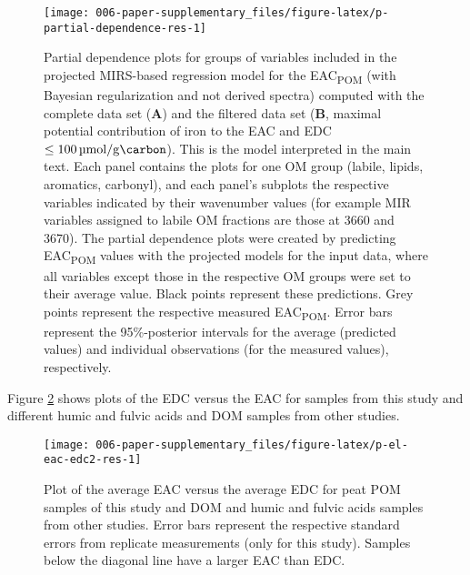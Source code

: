 \documentclass[draft,linenumbers]{agujournal2018}
\begin{document}
\begin{figure}[H]

{\centering \texttt{[image: 006-paper-supplementary\_files/figure-latex/p-partial-dependence-res-1]} 

}

\caption{Partial dependence plots for groups of variables included in the projected MIRS-based regression model for the EAC\textsubscript{POM} (with Bayesian regularization and not derived spectra) computed with the complete data set (\textbf{A}) and the filtered data set (\textbf{B}, maximal potential contribution of iron to the EAC and EDC $\le\SI{100}{\micro\mol\per\gram\carbon}$). This is the model interpreted in the main text. Each panel contains the plots for one OM group (labile, lipids, aromatics, carbonyl), and each panel's subplots the respective variables indicated by their wavenumber values (for example MIR variables assigned to labile OM fractions are those at 3660 and \SI{3670}{\wn}). The partial dependence plots were created by predicting EAC\textsubscript{POM} values with the projected models for the input data, where all variables except those in the respective OM groups were set to their average value. Black points represent these predictions. Grey points represent the respective measured EAC\textsubscript{POM}. Error bars represent the 95\%-posterior intervals for the average (predicted values) and individual observations (for the measured values), respectively.}\label{fig:p-partial-dependence-res}
\end{figure}

\clearpage

Figure \ref{fig:p-el-eac-edc2-res} shows plots of the EDC versus the EAC
for samples from this study and different humic and fulvic acids and DOM
samples from other studies.

\begin{figure}[H]

{\centering \texttt{[image: 006-paper-supplementary\_files/figure-latex/p-el-eac-edc2-res-1]} 

}

\caption{Plot of the average EAC versus the average EDC for peat POM samples of this study and DOM and humic and fulvic acids samples from other studies. Error bars represent the respective standard errors from replicate measurements (only for this study). Samples below the diagonal line have a larger EAC than EDC.}\label{fig:p-el-eac-edc2-res}
\end{figure}
\end{document}
